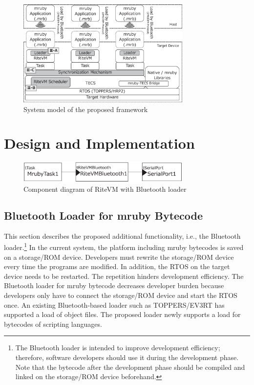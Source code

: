 \documentclass[conference]{IEEEtran/IEEEtran/IEEEtran}
\begin{document}
\begin{figure}[t]
    \centering
    \includegraphics[width=8.6cm,clip]{figure/system_model.eps}
    \vspace{-3mm}
\caption{System model of the proposed framework}
    \vspace{-3mm}
\label{fig:system_model}
\end{figure}

\section{Design and Implementation}
\label{sec:Design and Implementation}

\begin{figure}[t]
    \centering
    \includegraphics[width=8.6cm,clip]{figure/component_bluetooth.eps}
    \vspace{-3mm}
\caption{Component diagram of RiteVM with Bluetooth loader}
    \vspace{-3mm}
\label{fig:component_bluetooth}
\end{figure}

\subsection{Bluetooth Loader for mruby Bytecode}
\label{sec:Bluetooth loader for mruby bytecode}
This section describes the proposed additional functionality, i.e., the Bluetooth loader.\footnote{
The Bluetooth loader is intended to improve development efficiency; therefore, software developers should use it during the development phase.
Note that the bytecode after the development phase should be compiled and linked on the storage/ROM device beforehand.
}
In the current system, the platform including mruby bytecodes is saved on a storage/ROM device.
Developers must rewrite the storage/ROM device every time the programs are modified.
In addition, the RTOS on the target device needs to be restarted.
The repetition hinders development efficiency.
The Bluetooth loader for mruby bytecode decreases developer burden because developers only have to connect the storage/ROM device and start the RTOS once. 
An existing Bluetooth-based loader such as TOPPERS/EV3RT \cite{par:EV3} has supported a load of object files.
The proposed loader newly supports a load for bytecodes of scripting languages.
\end{document}
